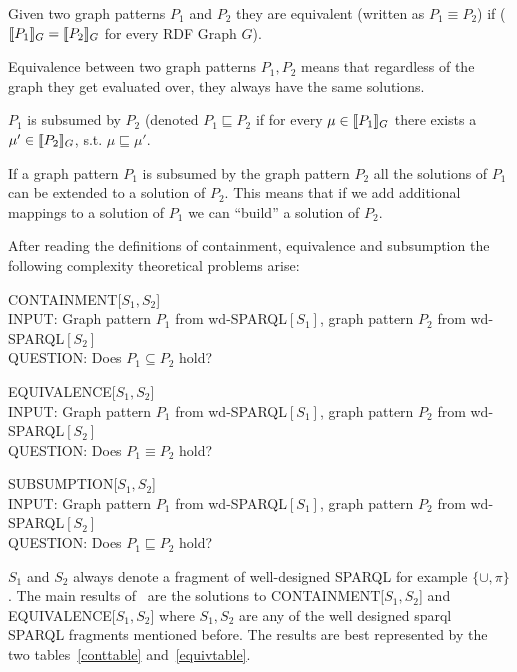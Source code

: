\begin{definition}[Equivalence]
Given two graph patterns $P_1$ and $P_2$ they are equivalent (written as $P_1
\equiv P_2$) if ($\llbracket P_1 \rrbracket_{G}  = \llbracket P_2 \rrbracket_{G} $ for every RDF Graph $G$).
\end{definition}
 Equivalence between two graph patterns $P_1,P_2$ means that regardless of the graph
 they get evaluated over, they always have the same solutions.

\begin{definition}[Subsumption]
\medskip\noindent $P_1$ is subsumed by $P_2$ (denoted $P_1 \sqsubseteq P_2$ if for every $\mu \in \llbracket P_1 \rrbracket_G$ there exists a $\mu' \in
\llbracket P_2 \rrbracket_G$, s.t. $\mu \sqsubseteq \mu'$. 
\end{definition}
If a graph pattern $P_1$ is subsumed by the graph pattern $P_2$ all the
solutions of $P_1$ can be extended to a solution of $P_2$. This means that if we
add additional mappings to a solution of $P_1$ we can ``build'' a solution of
$P_2$. 


\noindent After reading the definitions of containment, equivalence and
subsumption the following complexity theoretical problems arise:\\
\begin{framed}\noindent CONTAINMENT[$S_1,S_2$]\\
	INPUT: Graph pattern $P_1$ from wd-SPARQL$[S_1]$,
		 graph pattern $P_2$ from wd-SPARQL$[S_2]$\\
	QUESTION: Does $P_1 \subseteq P_2$ hold?
\end{framed}
\begin{framed}\noindent EQUIVALENCE[$S_1,S_2$]\\
	INPUT: Graph pattern $P_1$ from wd-SPARQL$[S_1]$,
		 graph pattern $P_2$ from wd-SPARQL$[S_2]$\\
	QUESTION: Does $P_1 \equiv P_2$ hold?
\end{framed}
\begin{framed}\noindent SUBSUMPTION[$S_1,S_2$]\\
	INPUT: Graph pattern $P_1$ from wd-SPARQL$[S_1]$,
		 graph pattern $P_2$ from wd-SPARQL$[S_2]$\\
	QUESTION: Does $P_1 \sqsubseteq P_2$ hold?
\end{framed}
$S_1$ and $S_2$ always denote a fragment of well-designed SPARQL for example
$\{\cup,\pi\}$. The main results of~\cite{pichler2014containment} are the
solutions to CONTAINMENT[$S_1,S_2$] and EQUIVALENCE[$S_1,S_2$] where $S_1,S_2$
are any of the well designed sparql SPARQL fragments mentioned before.
The results are best represented by the two
tables~\ref{conttable} and~\ref{equivtable}.

